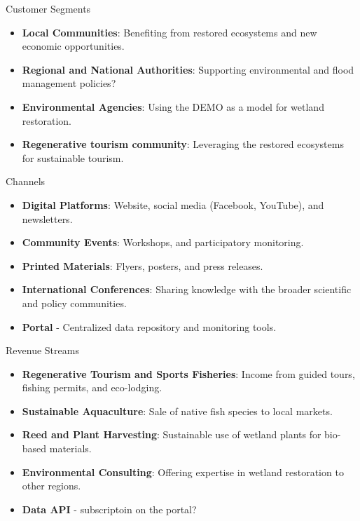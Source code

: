 \documentclass[
  ignorenonframetext,
]{beamer}
\providecommand{\tightlist}{%
  \setlength{\itemsep}{0pt}\setlength{\parskip}{0pt}}\usepackage{longtable,booktabs,array}
\begin{document}
\begin{frame}{Customer Segments}
\label{customer-segments}
\begin{itemize}
\tightlist
\item
  \textbf{Local Communities}: Benefiting from restored ecosystems and
  new economic opportunities.
\item
  \textbf{Regional and National Authorities}: Supporting environmental
  and flood management policies?
\item
  \textbf{Environmental Agencies}: Using the DEMO as a model for wetland
  restoration.
\item
  \textbf{Regenerative tourism community}: Leveraging the restored
  ecosystems for sustainable tourism.
\end{itemize}
\end{frame}

\begin{frame}{Channels}
\label{channels}
\begin{itemize}
\tightlist
\item
  \textbf{Digital Platforms}: Website, social media (Facebook, YouTube),
  and newsletters.
\item
  \textbf{Community Events}: Workshops, and participatory monitoring.
\item
  \textbf{Printed Materials}: Flyers, posters, and press releases.
\item
  \textbf{International Conferences}: Sharing knowledge with the broader
  scientific and policy communities.
\item
  \textbf{Portal} - Centralized data repository and monitoring tools.
\end{itemize}
\end{frame}

\begin{frame}{Revenue Streams}
\label{revenue-streams}
\begin{itemize}
\tightlist
\item
  \textbf{Regenerative Tourism and Sports Fisheries}: Income from guided
  tours, fishing permits, and eco-lodging.
\item
  \textbf{Sustainable Aquaculture}: Sale of native fish species to local
  markets.
\item
  \textbf{Reed and Plant Harvesting}: Sustainable use of wetland plants
  for bio-based materials.
\item
  \textbf{Environmental Consulting}: Offering expertise in wetland
  restoration to other regions.
\item
  \textbf{Data API} - subscriptoin on the portal?
\end{itemize}
\end{frame}
\end{document}
